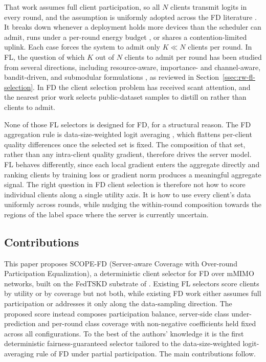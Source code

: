 \documentclass[journal]{IEEEtran}
\newcommand{\new}[1]{#1}
\newcommand{\revIVE}[1]{#1}
\newcommand{\rev}[1]{#1}
\begin{document}
That work assumes full client participation, so all $N$ clients transmit logits in every round, and the assumption is uniformly adopted across the FD literature \cite{itahara2023distillation, sattler2022cfd, sattler2023fedaux, wu2024fedict}. It breaks down whenever a deployment holds more devices than the scheduler can admit, runs under a per-round energy budget \rev{\cite{thakur2026grace}}, or shares a contention-limited uplink. Each case forces the system to admit only $K \ll N$ clients per round. \new{In FL, the question of which $K$ out of $N$ clients to admit per round has been studied from several directions, including resource-aware, importance- and channel-aware, bandit-driven, and submodular formulations \cite{nishio2019client, yang2020scheduling, ren2020scheduling, shi2020joint, xia2020mab, cho2020bandit, balakrishnan2022divfl}, as reviewed in Section~\ref{ssec:rw-fl-selection}.} In FD the client selection problem has received scant attention, and the nearest prior work \cite{liu2022active} selects public-dataset samples to distill on rather than clients to admit.

None of those FL selectors is designed for FD, for a structural reason. The FD aggregation rule is data-size-weighted logit averaging \cite{mu2024fedtskd, itahara2023distillation}, which flattens per-client quality differences once the selected set is fixed. The composition of that set, rather than any intra-client quality gradient, therefore drives the server model. FL behaves differently, since each local gradient enters the aggregate directly and ranking clients by training loss \cite{cho2020bandit, xia2020mab} or gradient norm \cite{ren2020scheduling} produces a meaningful aggregate signal. The right question in FD client selection is therefore not how to score individual clients along a single utility axis. It is how to use every client's data uniformly across rounds, while nudging the within-round composition towards the regions of the label space where the server is currently uncertain.

\subsection{Contributions}
\label{ssec:contributions}

This paper proposes SCOPE-FD (Server-aware Coverage with Over-round Participation Equalization), a deterministic client selector for FD over mMIMO networks, built on the FedTSKD substrate of \cite{mu2024fedtskd}. Existing FL selectors \cite{nishio2019client, cho2020bandit, xia2020mab, balakrishnan2022divfl} score clients by utility or by coverage but not both, while existing FD work \cite{mu2024fedtskd, itahara2023distillation, liu2022active} either assumes full participation or addresses it only along the data-sampling direction. The proposed score instead composes participation balance, server-side class under-prediction and per-round class coverage \revIVE{with non-negative coefficients held fixed across all configurations}. To the best of the authors' knowledge it is the first deterministic fairness-guaranteed selector tailored to the data-size-weighted logit-averaging rule of FD under partial participation. The main contributions follow.
\end{document}
